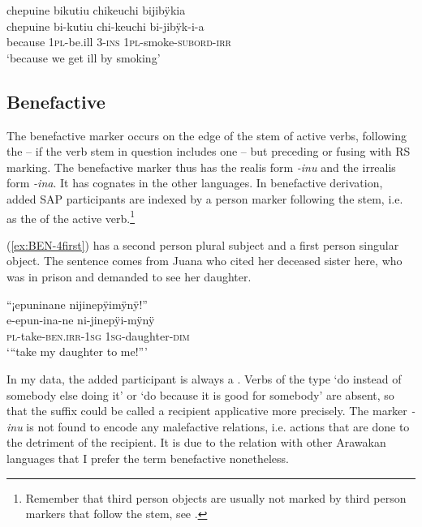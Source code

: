 \ea\label{ex:caus-peri-3}
\begingl
\glpreamble chepuine bikutiu chikeuchi bijibÿkia\\
\gla  chepuine bi-kutiu chi-keuchi bi-jibÿk-i-a\\
\glb because 1\textsc{pl}-be.ill 3-\textsc{ins} 1\textsc{pl}-smoke-\textsc{subord}-\textsc{irr}\\
\glft ‘because we get ill by smoking’
\endgl
\trailingcitation{[rxx-e120511l.384]}
\xe
 

\subsection{Benefactive}\label{sec:Benefactive}

The benefactive marker occurs on the edge of the stem of active verbs, following the  -- if the verb stem in question includes one -- but preceding or fusing with RS marking. The benefactive marker thus has the realis form \textit{-inu} and the irrealis form \textit{-ina}. It has cognates in the other  languages. In benefactive derivation, added SAP participants are indexed by a person marker following the stem, i.e. as the  of the active verb.\footnote{Remember that third person objects are usually not marked by third person markers that follow the stem, see .} 

(\ref{ex:BEN-4first}) has a second person plural subject and a first person singular object. The sentence comes from Juana who cited her deceased sister here, who was in prison and demanded to see her daughter.

\ea\label{ex:BEN-4first}
\begingl
\glpreamble “¡epuninane nijinepÿimÿnÿ!”\\
\gla e-epun-ina-ne ni-jinepÿi-mÿnÿ\\
\textsc{pl}-take-\textsc{ben.irr}-1\textsc{sg} 1\textsc{sg}-daughter-\textsc{dim}\\
\glft ‘“take my daughter to me!”’
\endgl
\trailingcitation{[jxx-p120430l-2.101]}
\xe

In my data, the added participant is always a . Verbs of the type ‘do instead of somebody else doing it’ or ‘do because it is good for somebody’ are absent, so that the suffix could be called a recipient applicative more precisely. The marker \textit{-inu} is not found to encode any malefactive relations, i.e. actions that are done to the detriment of the recipient. 
It is due to the relation with other Arawakan languages that I prefer the term benefactive nonetheless. 


